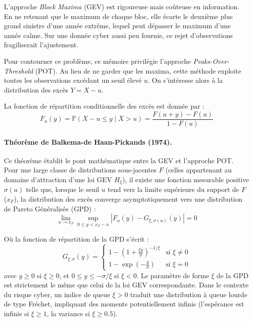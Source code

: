 

L'approche \textit{Block Maxima} (GEV) est rigoureuse mais coûteuse en information. En ne
retenant que le maximum de chaque bloc, elle écarte le deuxième plus grand sinistre d'une année
extrême, lequel peut dépasser le maximum d'une année calme. Sur une donnée cyber aussi peu
fournie, ce rejet d'observations fragiliserait l'ajustement.

Pour contourner ce problème, ce mémoire privilégie l'approche \textit{Peaks-Over-Threshold} (POT). Au lieu de ne garder que les maxima, cette méthode exploite toutes les observations excédant un seuil élevé $u$. On s'intéresse alors à la distribution des excès $Y = X - u$.

La fonction de répartition conditionnelle des excès est donnée par :
\begin{equation}
F_u(y) = \mathbb{P}(X - u \le y \mid X > u) = \frac{F(u+y) - F(u)}{1 - F(u)}
\end{equation}

\paragraph{Théorème de Balkema-de Haan-Pickands (1974).} Ce théorème établit le pont mathématique entre la GEV et l'approche POT. Pour une large classe de distributions sous-jacentes $F$ (celles appartenant au domaine d'attraction d'une loi GEV $H_\xi$), il existe une fonction mesurable positive $\sigma(u)$ telle que, lorsque le seuil $u$ tend vers la limite supérieure du support de $F$ ($x_F$), la distribution des excès converge asymptotiquement vers une distribution de Pareto Généralisée (GPD) :
\begin{equation}
\lim_{u \to x_F} \sup_{0 \le y < x_F - u} \left| F_u(y) - G_{\xi, \sigma(u)}(y) \right| = 0
\end{equation}

Où la fonction de répartition de la GPD s'écrit :
\begin{equation}
G_{\xi, \sigma}(y) =
\begin{cases}
1 - \left(1 + \frac{\xi y}{\sigma}\right)^{-1/\xi} & \text{si } \xi \neq 0 \\
1 - \exp\left(-\frac{y}{\sigma}\right) & \text{si } \xi = 0
\end{cases}
\end{equation}
avec $y \ge 0$ si $\xi \ge 0$, et $0 \le y \le -\sigma/\xi$ si $\xi < 0$. Le paramètre de forme $\xi$ de la GPD est strictement le même que celui de la loi GEV correspondante. Dans le contexte du risque cyber, un indice de queue $\xi > 0$ traduit une distribution à queue lourde de type Fréchet, impliquant des moments potentiellement infinis (l'espérance est infinie si $\xi \ge 1$, la variance si $\xi \ge 0.5$).





